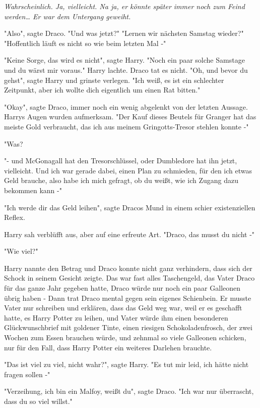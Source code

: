 {\emph{Wahrscheinlich. Ja, vielleicht. Na ja, er könnte später immer noch zum Feind werden… Er war dem Untergang geweiht.}

"Also", sagte Draco. "Und was jetzt?" "Lernen wir nächsten Samstag wieder?" "Hoffentlich läuft es nicht so wie beim letzten Mal -"

"Keine Sorge, das wird es nicht", sagte Harry. "Noch ein paar solche Samstage und du wärst mir voraus." Harry lachte. Draco tat es nicht. "Oh, und bevor du gehst", sagte Harry und grinste verlegen. "Ich weiß, es ist ein schlechter Zeitpunkt, aber ich wollte dich eigentlich um einen Rat bitten."

"Okay", sagte Draco, immer noch ein wenig abgelenkt von der letzten Aussage. Harrys Augen wurden aufmerksam. "Der Kauf dieses Beutels für Granger hat das meiste Gold verbraucht, das ich aus meinem Gringotts-Tresor stehlen konnte -"

"Was?

"- und McGonagall hat den Tresorschlüssel, oder Dumbledore hat ihn jetzt, vielleicht. Und ich war gerade dabei, einen Plan zu schmieden, für den ich etwas Geld brauche, also habe ich mich gefragt, ob du weißt, wie ich Zugang dazu bekommen kann -"

"Ich werde dir das Geld leihen", sagte Dracos Mund in einem schier existenziellen Reflex.

Harry sah verblüfft aus, aber auf eine erfreute Art. "Draco, das musst du nicht -"

"Wie viel?"

Harry nannte den Betrag und Draco konnte nicht ganz verhindern, dass sich der Schock in seinem Gesicht zeigte. Das war fast alles Taschengeld, das Vater Draco für das ganze Jahr gegeben hatte, Draco würde nur noch ein paar Galleonen übrig haben - Dann trat Draco mental gegen sein eigenes Schienbein. Er musste Vater nur schreiben und erklären, dass das Geld weg war, weil er es geschafft hatte, es Harry Potter zu leihen, und Vater würde ihm einen besonderen Glückwunschbrief mit goldener Tinte, einen riesigen Schokoladenfrosch, der zwei Wochen zum Essen brauchen würde, und zehnmal so viele Galleonen schicken, nur für den Fall, dass Harry Potter ein weiteres Darlehen brauchte.

"Das ist viel zu viel, nicht wahr?", sagte Harry. "Es tut mir leid, ich hätte nicht fragen sollen -"

"Verzeihung, ich bin ein Malfoy, weißt du", sagte Draco. "Ich war nur überrascht, dass du so viel willst."

}
